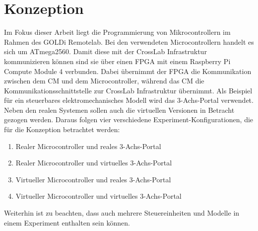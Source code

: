 \chapter{Konzeption} \label{konzeption}

Im Fokus dieser Arbeit liegt die Programmierung von Mikrocontrollern im Rahmen des GOLDi Remotelab. Bei den verwendeten Microcontrollern handelt es sich um ATmega2560. Damit diese mit der CrossLab Infrastruktur kommunizieren können sind sie über einen FPGA mit einem Raspberry Pi Compute Module 4 verbunden. Dabei übernimmt der FPGA die Kommunikation zwischen dem CM und dem Microcontroller, während das CM die Kommunikationsschnittstelle zur CrossLab Infrastruktur übernimmt. Als Beispiel für ein steuerbares elektromechanisches Modell wird das 3-Achs-Portal verwendet. Neben den realen Systemen sollen auch die virtuellen Versionen in Betracht gezogen werden. Daraus folgen vier verschiedene Experiment-Konfigurationen, die für die Konzeption betrachtet werden:

\begin{enumerate}
    \item Realer Microcontroller und reales 3-Achs-Portal
    \item Realer Microcontroller und virtuelles 3-Achs-Portal
    \item Virtueller Microcontroller und reales 3-Achs-Portal
    \item Virtueller Microcontroller und virtuelles 3-Achs-Portal
\end{enumerate}

Weiterhin ist zu beachten, dass auch mehrere Steuereinheiten und Modelle in einem Experiment enthalten sein können.





